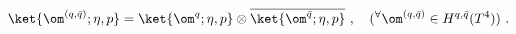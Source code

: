 \begin{equation}
\ket{\om^{(q,\bar{q})}; \eta, p} = \ket{\om^q;\eta,p}\otimes 
  \overline{\ket{\om^{\bar{q}};\eta,p}} ~,~~~
({}^{\forall} \om^{(q,\bar{q})} \in H^{q,\bar{q}}(T^4)) ~. 
\end{equation}

